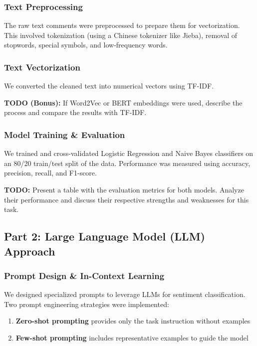 \documentclass{article}
\begin{document}
\subsubsection{Text Preprocessing}
\label{sssec:preprocessing}
The raw text comments were preprocessed to prepare them for vectorization. This involved tokenization (using a Chinese tokenizer like Jieba), removal of stopwords, special symbols, and low-frequency words.

\subsubsection{Text Vectorization}
\label{sssec:vectorization}
We converted the cleaned text into numerical vectors using TF-IDF.

\textbf{TODO (Bonus):} If Word2Vec or BERT embeddings were used, describe the process and compare the results with TF-IDF.

\subsubsection{Model Training \& Evaluation}
\label{sssec:ml_training}
We trained and cross-validated Logistic Regression and Naive Bayes classifiers on an 80/20 train/test split of the data. Performance was measured using accuracy, precision, recall, and F1-score.

\textbf{TODO:} Present a table with the evaluation metrics for both models. Analyze their performance and discuss their respective strengths and weaknesses for this task.

\subsection{Part 2: Large Language Model (LLM) Approach}
\label{ssec:llm_approach}

\subsubsection{Prompt Design \& In-Context Learning}
\label{sssec:prompt_design}

We designed specialized prompts to leverage LLMs for sentiment classification. Two prompt engineering strategies were implemented:

\begin{enumerate}
    \item \textbf{Zero-shot prompting} provides only the task instruction without examples
    \item \textbf{Few-shot prompting} includes representative examples to guide the model
\end{enumerate}
\end{document}

